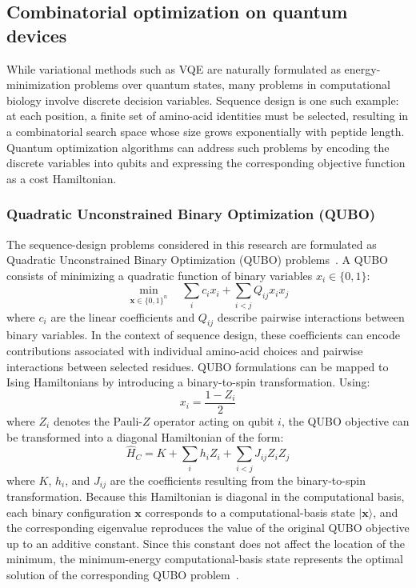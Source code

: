 \subsection{Combinatorial optimization on quantum devices}
While variational methods such as VQE are naturally formulated as energy-minimization problems over quantum states, many problems in computational biology involve discrete decision variables. Sequence design is one such example: at each position, a finite set of amino-acid identities must be selected, resulting in a combinatorial search space whose size grows exponentially with peptide length. Quantum optimization algorithms can address such problems by encoding the discrete variables into qubits and expressing the corresponding objective function as a cost Hamiltonian.
\subsubsection{Quadratic Unconstrained Binary Optimization (QUBO)}
The sequence-design problems considered in this research are formulated as Quadratic Unconstrained Binary Optimization (QUBO) problems~\cite{qubo_2}. A QUBO consists of minimizing a quadratic function of binary variables $x_i\in\{0,1\}$:
\begin{equation}
\min_{\mathbf{x}\in\{0,1\}^n} \quad \sum_i c_i x_i
+
\sum_{i<j}Q_{ij}x_ix_j
\end{equation}
where $c_i$ are the linear coefficients and $Q_{ij}$ describe pairwise interactions between binary variables. In the context of sequence design, these coefficients can encode contributions associated with individual amino-acid choices and pairwise interactions between selected residues.
QUBO formulations can be mapped to Ising Hamiltonians by introducing a binary-to-spin transformation. Using:
\begin{equation}
x_i=\frac{1-Z_i}{2}
\end{equation}
where $Z_i$ denotes the Pauli-$Z$ operator acting on qubit $i$, the QUBO objective can be transformed into a diagonal Hamiltonian of the form:
\begin{equation}
\hat{H}_C = K
+
\sum_i h_i Z_i
+
\sum_{i<j}J_{ij}Z_iZ_j
\end{equation}
where $K$, $h_i$, and $J_{ij}$ are the coefficients resulting from the binary-to-spin transformation. Because this Hamiltonian is diagonal in the computational basis, each binary configuration $\mathbf{x}$ corresponds to a computational-basis state $|\mathbf{x}\rangle$, and the corresponding eigenvalue reproduces the value of the original QUBO objective up to an additive constant. Since this constant does not affect the location of the minimum, the minimum-energy computational-basis state represents the optimal solution of the corresponding QUBO problem~\cite{qubo_1}.


